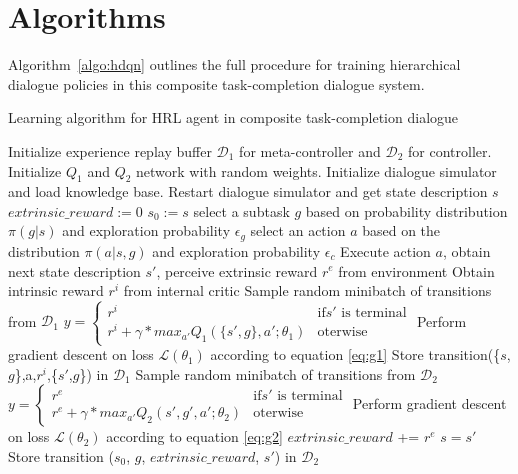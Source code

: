 \documentclass[11pt,letterpaper]{article}
\begin{document}
\section{Algorithms}
\label{app:appendix_algo}
Algorithm~\ref{algo:hdqn} outlines the full procedure for training hierarchical dialogue policies in this composite task-completion dialogue system.

\begin{algorithm*}[!bt]
\caption{Learning algorithm for HRL agent in composite task-completion dialogue}
\begin{algorithmic}[1]
\STATE Initialize experience replay buffer $\mathcal{D}_1$ for meta-controller and $\mathcal{D}_2$ for controller.
\STATE Initialize $Q_1$ and $Q_2$ network with random weights.
\STATE Initialize dialogue simulator and load knowledge base.
\STATE Restart dialogue simulator and get state description $s$
\STATE $extrinsic\_reward := 0$
\STATE $s_0 := s$
\STATE select a subtask $g$ based on probability distribution $\pi(g|s)$ and exploration probability $\epsilon_g$
\STATE select an action $a$ based on the distribution $\pi(a|s,g)$ and exploration probability $\epsilon_c$
\STATE Execute action $a$, obtain next state description $s'$, perceive extrinsic reward $r^e$ from environment
\STATE Obtain intrinsic reward  $r^i$ from internal critic
\STATE Sample random minibatch of transitions from $\mathcal{D}_1$
\STATE	$y = \begin{cases} r^i &\mbox{if} s' \mbox{ is terminal} \\ r^i + \gamma * max_{a'} Q_1(\{s',g\},a';\theta_1) & \mbox{oterwise}\end{cases}$
\STATE Perform gradient descent on loss $\mathcal{L}(\theta_1)$ according to equation \ref{eq:g1}
\STATE Store transition(\{$s$,$g$\},a,$r^i$,\{$s'$,$g$\}) in $\mathcal{D}_1$
\STATE Sample random minibatch of transitions from $\mathcal{D}_2$
\STATE	$y = \begin{cases} r^e &\mbox{if} s' \mbox{ is terminal} \\ r^e + \gamma * max_{a'} Q_2(s',g',a';\theta_2) & \mbox{oterwise}\end{cases}$
\STATE Perform gradient descent on loss $\mathcal{L}(\theta_2)$  according to equation \ref{eq:g2}
\STATE $extrinsic\_reward$ += $r^e$
\STATE $s = s'$
\ENDWHILE
\STATE Store transition ($s_0$, $g$, $extrinsic\_reward$, $s'$) in $\mathcal{D}_2$
\ENDWHILE
\ENDFOR
\end{algorithmic}
\label{algo:hdqn}
\end{algorithm*}
    
\end{document}
